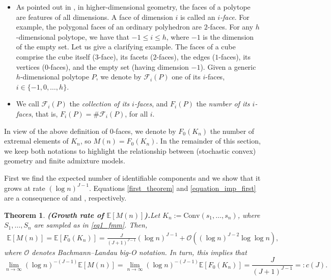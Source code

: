 \documentclass[10pt,a4paper]{amsart}
\theoremstyle{plain}
\newtheorem{theorem}{Theorem}
\begin{document}
\begin{itemize}
    \item As pointed out in \cite[Definition 2.1]{ziegler}, in higher-dimensional geometry, the faces of a polytope are features of all dimensions. A face of dimension $i$ is called an \textit{$i$-face}. For example, the polygonal faces of an ordinary polyhedron are $2$-faces. For any $h$-dimensional polytope, we have that $-1 \leq i \leq h$, where $-1$ is the dimension of the empty set. Let us  give a clarifying example. The faces of a cube comprise the cube itself ($3$-face), its facets ($2$-faces), the edges ($1$-faces), its vertices ($0$-faces), and the empty set (having dimension $-1$). Given a generic $h$-dimensional polytope $P$, we denote by $\mathcal{F}_i(P)$ one of its $i$-faces, $i \in \{-1,0,\ldots,h\}$.
    \item We call $\mathscr{F}_i(P)$ the \textit{collection of its $i$-faces}, and ${F}_i(P)$ the \textit{number of its $i$-faces}, that is, ${F}_i(P)=\#\mathscr{F}_i(P)$, for all $i$.
\end{itemize}

In view of the above definition of $0$-faces, we denote by $F_0(K_n)$ the number of extremal elements of $K_n$, so $M(n)=F_0(K_n)$. In the remainder of this section, we keep both notations to highlight the relationship between (stochastic convex) geometry and finite admixture models.

First we find the expected number of identifiable components and we show that it grows at rate $(\log n)^{J-1}$. Equations \eqref{first_theorem} and \eqref{equation_imp_first} are a consequence of \cite[Theorem 6]{reitzner} and \cite[Theorem 5]{barany2}, respectively.

\begin{theorem}{\textbf{(Growth rate of $\mathbb{E}[M(n)]$).}}\label{growth}
Let $K_n :=\text{Conv}({s}_1,\ldots,{s}_{n})$, where ${S}_1,\ldots,{S}_{n}$ are sampled as in \eqref{eq1_fmm}. Then,
\begin{align}\label{first_theorem}
\mathbb{E}[M(n)] = \mathbb{E} \left[F_0(K_n)\right] = \frac{J}{(J+1)^{J-1}}  (\log n)^{J-1} + \mathcal{O}\left((\log n)^{J-2}\log\log n\right),
\end{align}
where $\mathcal{O}$ denotes Bachmann–Landau big-O notation.
In turn, this implies that
\begin{equation}\label{equation_imp_first}
    \lim_{n \rightarrow \infty} (\log n)^{-(J-1)}\mathbb{E} \left[M(n)\right] = \lim_{n \rightarrow \infty} (\log n)^{-(J-1)}\mathbb{E} \left[F_0(K_n)\right] = \frac{J}{(J+1)^{J-1}}  =: c(J).
\end{equation}
\end{theorem}
\end{document}
